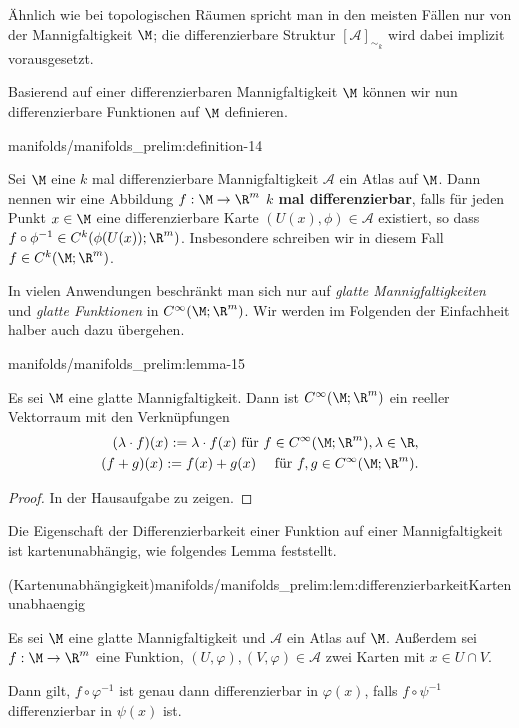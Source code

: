 \documentclass[letterpaper,10pt,german]{jupyterBook}
\begin{document}
\par
Ähnlich wie bei topologischen Räumen spricht man in den meisten Fällen nur von der Mannigfaltigkeit \(\M\); die differenzierbare Struktur \([\mathcal{A}]_{\sim_k}\) wird dabei implizit vorausgesetzt.

\par
Basierend auf einer differenzierbaren Mannigfaltigkeit \(\M\) können wir nun differenzierbare Funktionen auf \(\M\) definieren.
\begin{definition}{}{manifolds/manifolds_prelim:definition-14}



\par
Sei \(\M\) eine \(k\) mal differenzierbare Mannigfaltigkeit \(\mathcal{A}\) ein Atlas auf \(\M\).
Dann nennen wir eine Abbildung \(f:\M\to\R^m\) \textbf{\(k\) mal differenzierbar}, falls für jeden Punkt \(x\in\M\) eine differenzierbare Karte \((U(x),\phi)\in\mathcal{A}\) existiert, so dass \(f\circ\phi^{-1} \in C^k(\phi(U(x)); \R^m)\).
Insbesondere schreiben wir in diesem Fall \(f\in C^k(\M; \R^m)\).
\end{definition}

\par
In vielen Anwendungen beschränkt man sich nur auf \emph{glatte Mannigfaltigkeiten} und \emph{glatte Funktionen} in \(C^\infty(\M; \R^m)\).
Wir werden im Folgenden der Einfachheit halber auch dazu übergehen.
\begin{lemma}{}{manifolds/manifolds_prelim:lemma-15}



\par
Es sei \(\M\) eine glatte Mannigfaltigkeit.
Dann ist \(C^\infty(\M; \R^m)\) ein reeller Vektorraum mit den Verknüpfungen
\begin{align*}
(\lambda \cdot f)(x) := \lambda\cdot f(x)\text{ für } f\in C^\infty(\M; \R^m), \lambda\in\R,\\
(f + g)(x) := f(x) + g(x)\quad\text{ für } f,g\in C^\infty(\M; \R^m).
\end{align*}\end{lemma}

\begin{proof}
 In der Hausaufgabe zu zeigen.
\end{proof}

\par
Die Eigenschaft der Differenzierbarkeit einer Funktion auf einer Mannigfaltigkeit ist kartenunabhängig, wie folgendes Lemma feststellt.
\begin{lemma}{(Kartenunabhängigkeit)}{manifolds/manifolds_prelim:lem:differenzierbarkeitKartenunabhaengig}



\par
Es sei \(\M\) eine glatte Mannigfaltigkeit und \(\mathcal{A}\) ein Atlas auf \(\M\).
Außerdem sei \(f:\M \to \R^m\) eine Funktion, \((U,\varphi), (V,\varphi)\in \mathcal{A}\) zwei Karten mit \(x \in U\cap V\).

\par
Dann gilt, \(f\circ\varphi^{-1}\) ist genau dann differenzierbar in \(\varphi(x)\), falls \(f\circ\psi^{-1}\) differenzierbar in \(\psi(x)\) ist.
\end{lemma}
\end{document}
